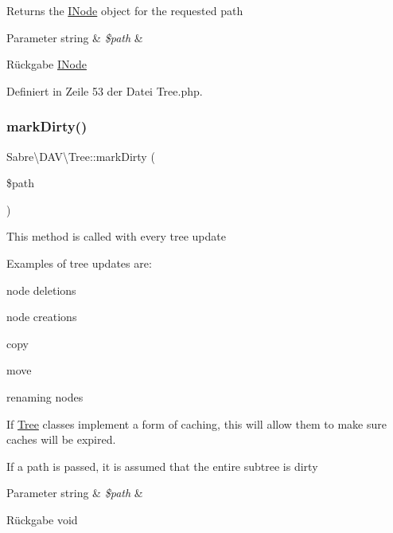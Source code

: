 Returns the \mbox{\hyperlink{interface_sabre_1_1_d_a_v_1_1_i_node}{I\+Node}} object for the requested path


\begin{DoxyParams}[1]{Parameter}
string & {\em \$path} & \\
\hline
\end{DoxyParams}
\begin{DoxyReturn}{Rückgabe}
\mbox{\hyperlink{interface_sabre_1_1_d_a_v_1_1_i_node}{I\+Node}} 
\end{DoxyReturn}


Definiert in Zeile 53 der Datei Tree.\+php.

\mbox{\label{class_sabre_1_1_d_a_v_1_1_tree_a6620dc04c009acd09de1a0f66a43dc47}} 
\subsubsection{\texorpdfstring{mark\+Dirty()}{markDirty()}}
{\footnotesize\ttfamily Sabre\textbackslash{}\+D\+A\+V\textbackslash{}\+Tree\+::mark\+Dirty (\begin{DoxyParamCaption}\item[{}]{\$path }\end{DoxyParamCaption})}

This method is called with every tree update

Examples of tree updates are\+:
\begin{DoxyItemize}
\item node deletions
\item node creations
\item copy
\item move
\item renaming nodes
\end{DoxyItemize}

If \mbox{\hyperlink{class_sabre_1_1_d_a_v_1_1_tree}{Tree}} classes implement a form of caching, this will allow them to make sure caches will be expired.

If a path is passed, it is assumed that the entire subtree is dirty


\begin{DoxyParams}[1]{Parameter}
string & {\em \$path} & \\
\hline
\end{DoxyParams}
\begin{DoxyReturn}{Rückgabe}
void 
\end{DoxyReturn}


